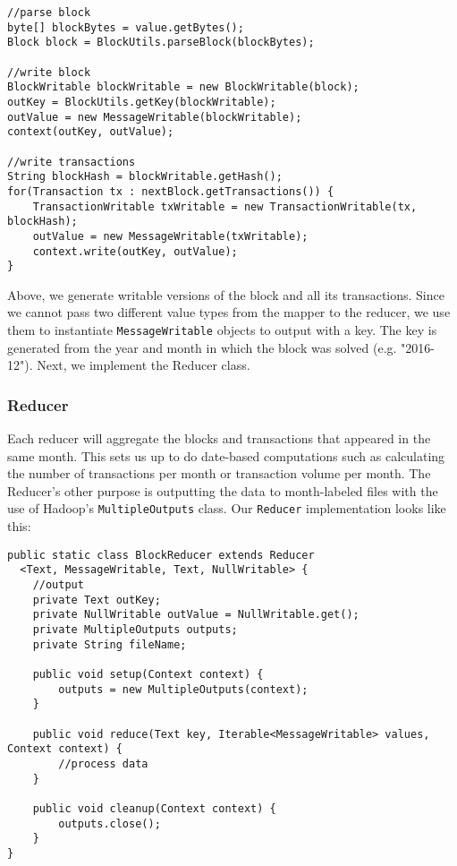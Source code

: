 \documentclass[9pt,twocolumn,twoside]{idsi}
\begin{document}
\begin{lstlisting}
//parse block
byte[] blockBytes = value.getBytes();
Block block = BlockUtils.parseBlock(blockBytes);

//write block
BlockWritable blockWritable = new BlockWritable(block);
outKey = BlockUtils.getKey(blockWritable);
outValue = new MessageWritable(blockWritable);
context(outKey, outValue);

//write transactions
String blockHash = blockWritable.getHash();
for(Transaction tx : nextBlock.getTransactions()) {
    TransactionWritable txWritable = new TransactionWritable(tx, blockHash);
    outValue = new MessageWritable(txWritable);
    context.write(outKey, outValue);
}
\end{lstlisting}

Above, we generate writable versions of the block and all its transactions. Since we cannot pass two different value types from the mapper to the reducer, we use them to instantiate \lstinline{MessageWritable} objects to output with a key. The key is generated from the year and month in which the block was solved (e.g. "2016-12"). Next, we implement the Reducer class.

\subsubsection{Reducer}
Each reducer will aggregate the blocks and transactions that appeared in the same month. This sets us up to do date-based computations such as calculating the number of transactions per month or transaction volume per month. The Reducer's other purpose is outputting the data to  month-labeled files with the use of Hadoop's \lstinline{MultipleOutputs} class. Our \lstinline{Reducer} implementation looks like this:

\begin{lstlisting}
public static class BlockReducer extends Reducer
  <Text, MessageWritable, Text, NullWritable> {
    //output
    private Text outKey;
    private NullWritable outValue = NullWritable.get();
    private MultipleOutputs outputs;
    private String fileName;

    public void setup(Context context) {
        outputs = new MultipleOutputs(context);
    }

    public void reduce(Text key, Iterable<MessageWritable> values, Context context) {
        //process data
    }

    public void cleanup(Context context) {
        outputs.close();
    }
}
\end{lstlisting}
\end{document}
